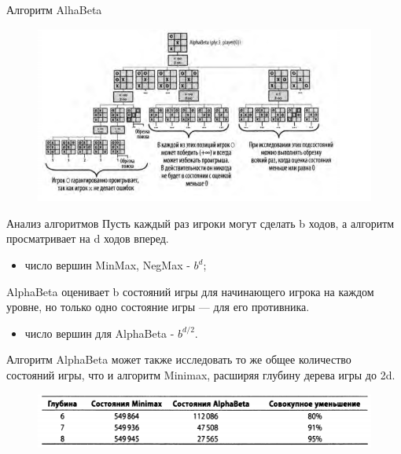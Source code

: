 \documentclass{beamer}
\begin{document}
\begin{frame}{Алгоритм AlhaBeta}
\begin{figure}[h]
\centering
\includegraphics[scale=0.6]{images/lec05-pic11.png}
\end{figure}
\end{frame}

\begin{frame}{Анализ алгоритмов}
Пусть каждый раз игроки могут сделать b ходов, а алгоритм просматривает на d ходов вперед. 
\begin{itemize}
\item число вершин MinMax, NegMax - $b^d$;
\end{itemize}
AlphaBeta оценивает b состояний игры для начинающего игрока на каждом уровне, но только одно состояние игры — для его противника. 
\begin{itemize}
\item число вершин для AlphaBeta - $b^{d/2}$.
\end{itemize}
Алгоритм AlphaBeta может также исследовать то же общее количество состояний игры, что и алгоритм Minimax, расширяя глубину дерева игры до 2d.
\begin{figure}[h]
\centering
\includegraphics[scale=0.4]{images/lec05-pic12.png}
\end{figure}
\end{frame}
\end{document}
